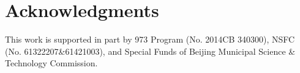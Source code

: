 \documentclass[10pt,journal,compsoc,twoside]{IEEEtran}
\newcounter{definition}[section]
\newcounter{alg}[section]
\begin{document}
%














\section*{Acknowledgments}
This work is supported in part by  973 Program ({\small No. 2014CB 340300}), NSFC ({\small No. 61322207\&61421003}), and Special Funds of Beijing Municipal Science \& Technology Commission.



%
%
%
\end{document}
